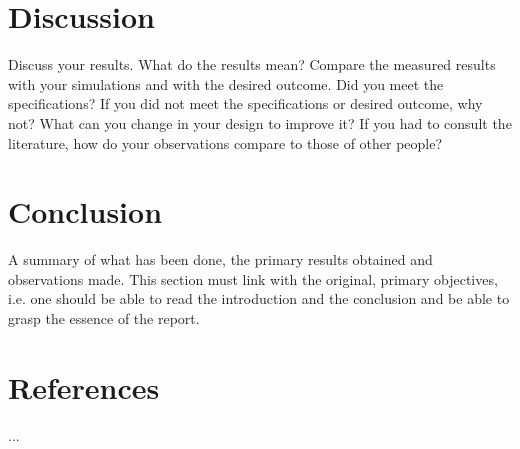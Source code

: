 \documentclass[a4paper,12pt]{report}
\begin{document}
\section{Discussion}

Discuss your results. What do the results mean? Compare the measured results with your simulations and with the desired outcome. Did you meet the specifications? If you did not meet the specifications or desired outcome, why not? What can you change in your design to improve it? If you had to consult the literature, how do your observations compare to those of other people?

\section{Conclusion}
A summary of what has been done, the primary results obtained and observations made.  This section must link with the original, primary objectives, i.e. one should be able to read the introduction and the conclusion and be able to grasp the essence of the report.  

\section{References}

...
\end{document}
